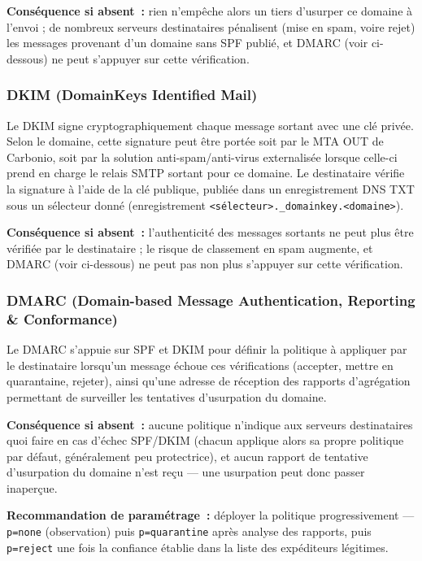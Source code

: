 \documentclass[11pt,a4paper]{report}
\begin{document}
\textbf{Conséquence si absent~:} rien n'empêche alors un tiers d'usurper ce domaine à l'envoi ; de nombreux serveurs destinataires pénalisent (mise en spam, voire rejet) les messages provenant d'un domaine sans SPF publié, et DMARC (voir ci-dessous) ne peut s'appuyer sur cette vérification.

\subsubsection{DKIM (DomainKeys Identified Mail)}
Le DKIM signe cryptographiquement chaque message sortant avec une clé privée. Selon le domaine, cette signature peut être portée soit par le MTA OUT de Carbonio, soit par la solution anti-spam/anti-virus externalisée lorsque celle-ci prend en charge le relais SMTP sortant pour ce domaine. Le destinataire vérifie la signature à l'aide de la clé publique, publiée dans un enregistrement DNS TXT sous un sélecteur donné (enregistrement \texttt{<sélecteur>.\_domainkey.<domaine>}).

\textbf{Conséquence si absent~:} l'authenticité des messages sortants ne peut plus être vérifiée par le destinataire ; le risque de classement en spam augmente, et DMARC (voir ci-dessous) ne peut pas non plus s'appuyer sur cette vérification.

\subsubsection{DMARC (Domain-based Message Authentication, Reporting \& Conformance)}
Le DMARC s'appuie sur SPF et DKIM pour définir la politique à appliquer par le destinataire lorsqu'un message échoue ces vérifications (accepter, mettre en quarantaine, rejeter), ainsi qu'une adresse de réception des rapports d'agrégation permettant de surveiller les tentatives d'usurpation du domaine.

\textbf{Conséquence si absent~:} aucune politique n'indique aux serveurs destinataires quoi faire en cas d'échec SPF/DKIM (chacun applique alors sa propre politique par défaut, généralement peu protectrice), et aucun rapport de tentative d'usurpation du domaine n'est reçu --- une usurpation peut donc passer inaperçue.

\textbf{Recommandation de paramétrage~:} déployer la politique progressivement --- \texttt{p=none} (observation) puis \texttt{p=quarantine} après analyse des rapports, puis \texttt{p=reject} une fois la confiance établie dans la liste des expéditeurs légitimes.
\end{document}
